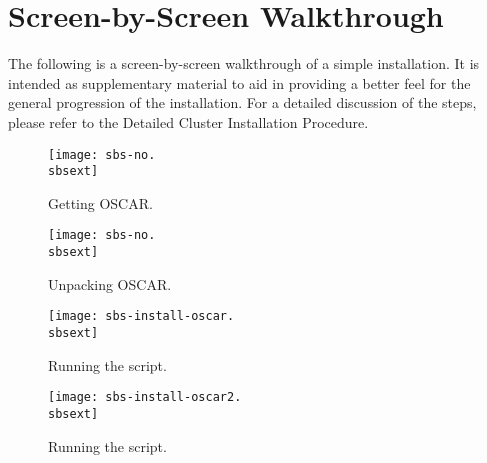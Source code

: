 %
%
%

\newpage

\section{Screen-by-Screen Walkthrough}
\label{app:screen-by-screen}

The following is a screen-by-screen walkthrough of a simple installation.
It is intended as supplementary material to aid in providing a better feel
for the general progression of the installation.  For a detailed discussion
of the steps, please refer to the Detailed Cluster Installation Procedure.

\setlength{\oddsidemargin}{-0.5in}
\setlength{\evensidemargin}{-0.5in}
\setlength{\textwidth}{7.5in}

\begin{figure}[htbp]
  \begin{center}
    \texttt{[image: sbs-no.\\sbsext]}
    \caption{Getting OSCAR.}
    \label{fig:sbs-getting-oscar}
  \end{center}
\end{figure}

\begin{figure}[htbp]
  \begin{center}
    \texttt{[image: sbs-no.\\sbsext]}
    \caption{Unpacking OSCAR.}
    \label{fig:sbs-unpacking-oscar}
  \end{center}
\end{figure}

\begin{figure}[htbp]
  \begin{center}
    \texttt{[image: sbs-install-oscar.\\sbsext]}
    \caption{Running the  script.}
    \label{fig:sbs-install-oscar}
  \end{center}
\end{figure}

\begin{figure}[htbp]
  \begin{center}
    \texttt{[image: sbs-install-oscar2.\\sbsext]}
    \caption{Running the  script.}
    \label{fig:sbs-install-oscar2}
  \end{center}
\end{figure}

